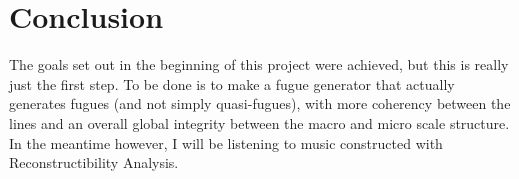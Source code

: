 \documentclass[11pt]{article}
\begin{document}
\section{Conclusion}

The goals set out in the beginning of this project were achieved, but this is really just the first step.  To be done is to make a fugue generator that actually generates fugues (and not simply quasi-fugues), with more coherency between the lines and an overall global integrity between the macro and micro scale structure.  In the meantime however, I will be listening to music constructed with Reconstructibility Analysis.  
\end{document}
